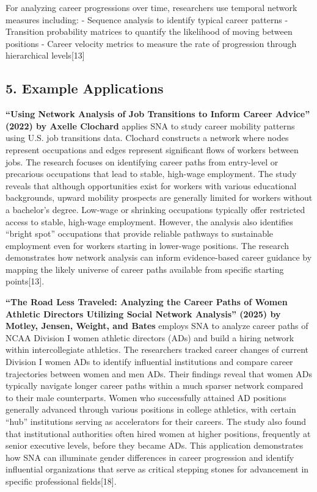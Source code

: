 \documentclass[
  letterpaper,
  DIV=11,
  numbers=noendperiod]{scrartcl}
\begin{document}
For analyzing career progressions over time, researchers use temporal
network measures including: - Sequence analysis to identify typical
career patterns - Transition probability matrices to quantify the
likelihood of moving between positions - Career velocity metrics to
measure the rate of progression through hierarchical levels{[}13{]}

\subsection{5. Example Applications}\label{example-applications}

\textbf{``Using Network Analysis of Job Transitions to Inform Career
Advice'' (2022) by Axelle Clochard} applies SNA to study career mobility
patterns using U.S. job transitions data. Clochard constructs a network
where nodes represent occupations and edges represent significant flows
of workers between jobs. The research focuses on identifying career
paths from entry-level or precarious occupations that lead to stable,
high-wage employment. The study reveals that although opportunities
exist for workers with various educational backgrounds, upward mobility
prospects are generally limited for workers without a bachelor's degree.
Low-wage or shrinking occupations typically offer restricted access to
stable, high-wage employment. However, the analysis also identifies
``bright spot'' occupations that provide reliable pathways to
sustainable employment even for workers starting in lower-wage
positions. The research demonstrates how network analysis can inform
evidence-based career guidance by mapping the likely universe of career
paths available from specific starting points{[}13{]}.

\textbf{``The Road Less Traveled: Analyzing the Career Paths of Women
Athletic Directors Utilizing Social Network Analysis'' (2025) by Motley,
Jensen, Weight, and Bates} employs SNA to analyze career paths of NCAA
Division I women athletic directors (ADs) and build a hiring network
within intercollegiate athletics. The researchers tracked career changes
of current Division I women ADs to identify influential institutions and
compare career trajectories between women and men ADs. Their findings
reveal that women ADs typically navigate longer career paths within a
much sparser network compared to their male counterparts. Women who
successfully attained AD positions generally advanced through various
positions in college athletics, with certain ``hub'' institutions
serving as accelerators for their careers. The study also found that
institutional authorities often hired women at higher positions,
frequently at senior executive levels, before they became ADs. This
application demonstrates how SNA can illuminate gender differences in
career progression and identify influential organizations that serve as
critical stepping stones for advancement in specific professional
fields{[}18{]}.
\end{document}
